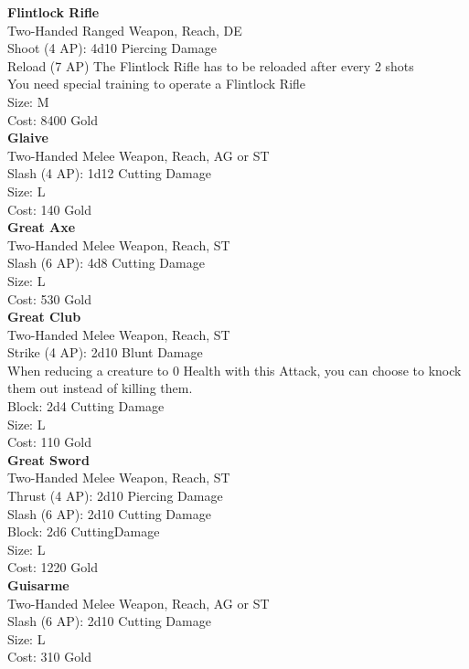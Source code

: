 \textbf{Flintlock Rifle}\\
Two-Handed Ranged Weapon,  Reach, DE\\
Shoot (4 AP): 4d10 Piercing Damage\\
Reload (7 AP) The Flintlock Rifle has to be reloaded after every 2 shots\\
You need special training to operate a Flintlock Rifle\\
Size: M\\
Cost: 8400 Gold\\

\textbf{Glaive}\\
Two-Handed Melee Weapon,  Reach, AG or ST\\
Slash (4 AP): 1d12 Cutting Damage\\
Size: L\\
Cost: 140 Gold\\


\textbf{Great Axe}\\
Two-Handed Melee Weapon,  Reach, ST\\
Slash (6 AP): 4d8 Cutting Damage\\
Size: L\\
Cost: 530 Gold\\

\textbf{Great Club}\\
Two-Handed Melee Weapon,  Reach, ST\\
Strike (4 AP): 2d10 Blunt Damage\\
When reducing a creature to 0 Health with this Attack, you can choose to knock them out instead of killing them.\\
Block: 2d4 Cutting Damage\\
Size: L\\
Cost: 110 Gold\\


\textbf{Great Sword}\\
Two-Handed Melee Weapon,  Reach, ST\\
Thrust (4 AP): 2d10 Piercing Damage\\
Slash (6 AP): 2d10 Cutting Damage\\
Block: 2d6 CuttingDamage\\
Size: L\\
Cost: 1220 Gold\\


\textbf{Guisarme}\\
Two-Handed Melee Weapon,  Reach, AG or ST\\
Slash (6 AP): 2d10 Cutting Damage\\
Size: L\\
Cost: 310 Gold\\


